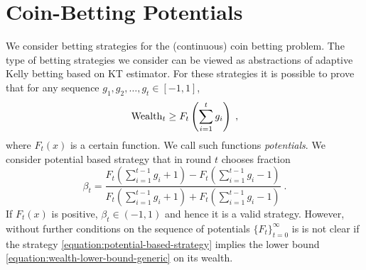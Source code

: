 \section{Coin-Betting Potentials}
\label{section:coin-betting-potentials}

We consider betting strategies for the (continuous) coin betting problem. The
type of betting strategies we consider can be viewed as abstractions of
adaptive Kelly betting based on KT estimator. For these strategies
it is possible to prove that for any sequence $g_1, g_2, \dots, g_t \in [-1,1]$,
\begin{equation}
\label{equation:wealth-lower-bound-generic}
\operatorname{Wealth}_t \ge F_t \left( \sum_{i=1}^t g_i \right) \; ,
\end{equation}
where $F_t(x)$ is a certain function. We call such functions \emph{potentials}.
We consider potential based strategy that in round $t$ chooses fraction
\begin{equation}
\label{equation:potential-based-strategy}
\beta_t = \frac{F_t(\sum_{i=1}^{t-1} g_i + 1) - F_t(\sum_{i=1}^{t-1} g_i - 1)}{F_t(\sum_{i=1}^{t-1} g_i + 1) + F_t(\sum_{i=1}^{t-1} g_i - 1)} \; .
\end{equation}
If $F_t(x)$ is positive, $\beta_t \in (-1,1)$ and hence it is a valid
strategy. However, without further conditions on the sequence of potentials
$\{F_t\}_{t=0}^\infty$ is is not clear if the strategy
\eqref{equation:potential-based-strategy} implies the lower bound
\eqref{equation:wealth-lower-bound-generic} on its wealth.

